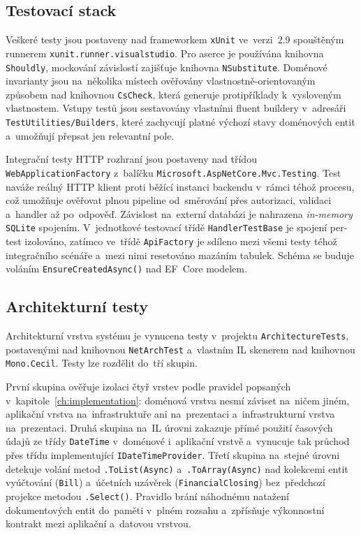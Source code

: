 \subsection{Testovací stack}
\label{subsec:test-stack}

Veškeré testy jsou postaveny nad frameworkem \texttt{xUnit} ve~verzi~2.9 spouštěným runnerem \texttt{xunit.runner.visualstudio}.
Pro aserce je používána knihovna \texttt{Shouldly}, mockování závislostí zajišťuje knihovna \texttt{NSubstitute}.
Doménové invarianty jsou na~několika místech ověřovány vlastnostně-orientovaným způsobem nad knihovnou \texttt{CsCheck}, která generuje protipříklady k~vysloveným vlastnostem.
Vstupy testů jsou sestavovány vlastními fluent buildery v~adresáři \texttt{TestUtilities/Builders}, které zachycují platné výchozí stavy doménových entit a~umožňují přepsat jen relevantní pole.

Integrační testy HTTP rozhraní jsou postaveny nad třídou \texttt{WebApplicationFactory} z~balíčku \texttt{Microsoft.AspNetCore.Mvc.Testing}.
Test naváže reálný HTTP klient proti běžící instanci backendu v~rámci téhož procesu, což umožňuje ověřovat plnou pipeline od~směrování přes autorizaci, validaci a~handler až po~odpověď.
Závislost na~externí databázi je nahrazena \emph{in-memory} \texttt{SQLite} spojením.
V~jednotkové testovací třídě \texttt{HandlerTestBase} je spojení per-test izolováno, zatímco ve~třídě \texttt{ApiFactory} je sdíleno mezi všemi testy téhož integračního scénáře a~mezi nimi resetováno mazáním tabulek.
Schéma se buduje voláním \texttt{EnsureCreatedAsync()} nad EF~Core modelem.

\subsection{Architekturní testy}
\label{subsec:test-architecture}

Architekturní vrstva systému je vynucena testy v~projektu \texttt{ArchitectureTests}, postavenými nad knihovnou \texttt{NetArchTest} a~vlastním IL skenerem nad knihovnou \texttt{Mono.Cecil}.
Testy lze rozdělit do~tří skupin.

První skupina ověřuje izolaci čtyř vrstev podle pravidel popsaných v~kapitole~\ref{ch:implementation}: doménová vrstva nesmí záviset na~ničem jiném, aplikační vrstva na~infrastruktuře ani na~prezentaci a~infrastrukturní vrstva na~prezentaci.
Druhá skupina na~IL úrovni zakazuje přímé použití časových údajů ze třídy \texttt{DateTime} v~doménové i~aplikační vrstvě a~vynucuje tak průchod přes třídu implementující \texttt{IDateTimeProvider}.
Třetí skupina na~stejné úrovni detekuje volání metod \texttt{.ToList(Async)} a~\texttt{.ToArray(Async)} nad kolekcemi entit vyúčtování (\texttt{Bill}) a~účetních uzávěrek (\texttt{FinancialClosing}) bez~předchozí projekce metodou \texttt{.Select()}.
Pravidlo brání náhodnému natažení dokumentových entit do~paměti v~plném rozsahu a~zpřísňuje výkonnostní kontrakt mezi aplikační a~datovou vrstvou.

